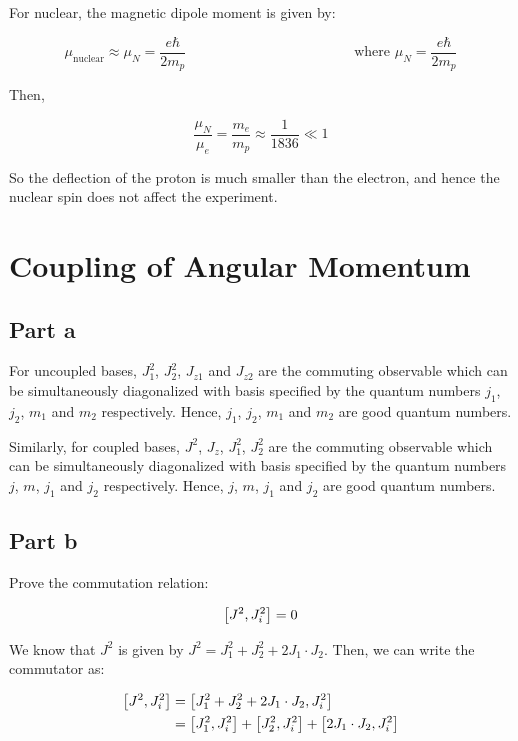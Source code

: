 \documentclass{article}
\begin{document}
For nuclear, the magnetic dipole moment is given by:

\begin{equation}
  \mu_{\text{nuclear}} \approx \mu_N = \frac{e\hbar}{2m_p} \hspace{2in} \text{where } \mu_N = \frac{e\hbar}{2m_p}
\end{equation}

Then,

\begin{equation}
  \frac{\mu_N}{\mu_e} = \frac{m_e}{m_p} \approx \frac{1}{1836} \ll 1
\end{equation}

So the deflection of the proton is much smaller than the electron, and hence the 
nuclear spin does not affect the experiment.

\section{Coupling of Angular Momentum}

\subsection{Part a}

For uncoupled bases, $J_1^2$, $J_2^2$, $J_{z1}$ and $J_{z2}$ are the commuting observable which 
can be simultaneously diagonalized with basis specified by the quantum numbers $j_1$, $j_2$, $m_1$ 
and $m_2$ respectively. Hence,  $j_1$, $j_2$, $m_1$ and $m_2$ are good quantum numbers.

Similarly, for coupled bases, $J^2$, $J_z$, $J_1^2$, $J_2^2$ are the commuting observable which can be
simultaneously diagonalized with basis specified by the quantum numbers $j$, $m$, $j_1$ and $j_2$
respectively. Hence, $j$, $m$, $j_1$ and $j_2$ are good quantum numbers.

\subsection{Part b}

Prove the commutation relation:

\begin{equation}
  \commutator{J^2}{J_i^2} = 0
\end{equation}

We know that $J^2$ is given by $J^2 = J_1^2 + J_2^2 + 2J_1 \cdot J_2$. Then, we can write the commutator as:

\begin{align*}
  \commutator{J^2}{ J_i^2} &= \commutator{J_1^2 + J_2^2 + 2J_1 \cdot J_2}{J_i^2} \\
  &= \commutator{J_1^2}{J_i^2} + \commutator{J_2^2}{J_i^2} + \commutator{2J_1 \cdot J_2}{J_i^2} \\
\end{align*}
\end{document}
